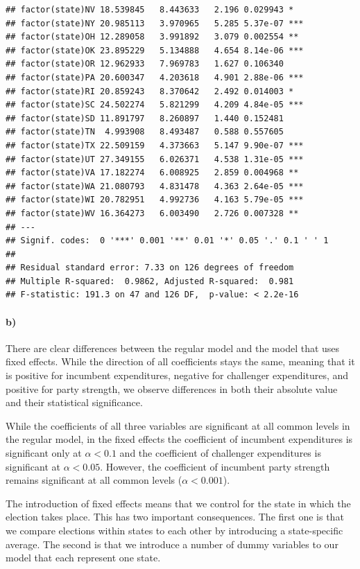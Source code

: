 \documentclass[12pt]{article}\usepackage[]{graphicx}\usepackage[]{color}
\makeatletter
\newenvironment{kframe}{%
 \def\at@end@of@kframe{}%
 \ifinner\ifhmode%
  \def\at@end@of@kframe{\end{minipage}}%
  \begin{minipage}{\columnwidth}%
 \fi\fi%
 \def\FrameCommand##1{\hskip\@totalleftmargin \hskip-\fboxsep
 \colorbox{shadecolor}{##1}\hskip-\fboxsep
     \hskip-\linewidth \hskip-\@totalleftmargin \hskip\columnwidth}%
 \MakeFramed {\advance\hsize-\width
   \@totalleftmargin\z@ \linewidth\hsize
   \@setminipage}}%
 {\par\unskip\endMakeFramed%
 \at@end@of@kframe}
\newenvironment{knitrout}{}{} %
\makeatother
\begin{document}
\begin{knitrout}
\begin{kframe}
\begin{verbatim}
## factor(state)NV 18.539845   8.443633   2.196 0.029943 *  
## factor(state)NY 20.985113   3.970965   5.285 5.37e-07 ***
## factor(state)OH 12.289058   3.991892   3.079 0.002554 ** 
## factor(state)OK 23.895229   5.134888   4.654 8.14e-06 ***
## factor(state)OR 12.962933   7.969783   1.627 0.106340    
## factor(state)PA 20.600347   4.203618   4.901 2.88e-06 ***
## factor(state)RI 20.859243   8.370642   2.492 0.014003 *  
## factor(state)SC 24.502274   5.821299   4.209 4.84e-05 ***
## factor(state)SD 11.891797   8.260897   1.440 0.152481    
## factor(state)TN  4.993908   8.493487   0.588 0.557605    
## factor(state)TX 22.509159   4.373663   5.147 9.90e-07 ***
## factor(state)UT 27.349155   6.026371   4.538 1.31e-05 ***
## factor(state)VA 17.182274   6.008925   2.859 0.004968 ** 
## factor(state)WA 21.080793   4.831478   4.363 2.64e-05 ***
## factor(state)WI 20.782951   4.992736   4.163 5.79e-05 ***
## factor(state)WV 16.364273   6.003490   2.726 0.007328 ** 
## ---
## Signif. codes:  0 '***' 0.001 '**' 0.01 '*' 0.05 '.' 0.1 ' ' 1
## 
## Residual standard error: 7.33 on 126 degrees of freedom
## Multiple R-squared:  0.9862,	Adjusted R-squared:  0.981 
## F-statistic: 191.3 on 47 and 126 DF,  p-value: < 2.2e-16
\end{verbatim}
\end{kframe}
\end{knitrout}

\paragraph{b)} 

There are clear differences between the regular model and the model that uses fixed effects. While the direction of all coefficients stays the same, meaning that it is positive for incumbent expenditures, negative for challenger expenditures, and positive for party strength, we observe differences in both their absolute value and their statistical significance.

While the coefficients of all three variables are significant at all common levels in the regular model, in the fixed effects the coefficient of incumbent expenditures is significant only at $\alpha < 0.1$ and the coefficient of challenger expenditures is significant at $\alpha < 0.05$. However, the coefficient of incumbent party strength remains significant at all common levels ($\alpha < 0.001$).

The introduction of fixed effects means that we control for the state in which the election takes place. This has two important consequences. The first one is that  we compare elections within states to each other by introducing a state-specific average. The second is that we introduce a number of dummy variables to our model that each represent one state.
\end{document}
